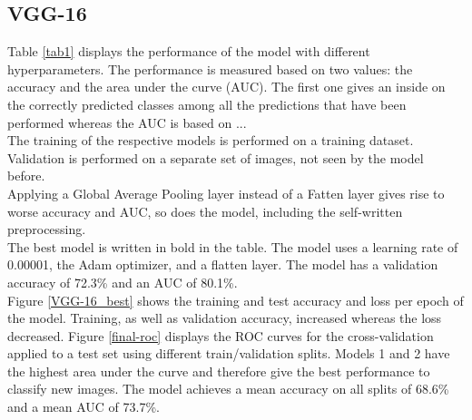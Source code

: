 \documentclass[sn-mathphys,Numbered]{sn-jnl}%
\theoremstyle{thmstyleone}%
\theoremstyle{thmstyletwo}%
\theoremstyle{thmstylethree}%
\begin{document}
\subsection{VGG-16}\label{VGG-16_Results}
Table \ref{tab1} displays the performance of the model with different hyperparameters. The performance is measured based on two values: the accuracy and the area under the curve (AUC). The first one gives an inside on the correctly predicted classes among all the predictions that have been performed whereas the AUC is based on ... \\
The training of the respective models is performed on a training dataset. Validation is performed on a separate set of images, not seen by the model before.\\
Applying a Global Average Pooling layer instead of a Fatten layer gives rise to worse accuracy and AUC, so does the model, including the self-written preprocessing.\\
The best model is written in bold in the table. The model uses a learning rate of 0.00001, the Adam optimizer, and a flatten layer. The model has a validation accuracy of 72.3\% and an AUC of 80.1\%.\\
Figure \ref{VGG-16_best} shows the training and test accuracy and loss per epoch of the model. Training, as well as validation accuracy, increased whereas the loss decreased. Figure \ref{final-roc} displays the ROC curves for the cross-validation applied to a test set using different train/validation splits. Models 1 and 2 have the highest area under the curve and therefore give the best performance to classify new images. The model achieves a mean accuracy on all splits of 68.6\% and a mean AUC of 73.7\%.
\end{document}
